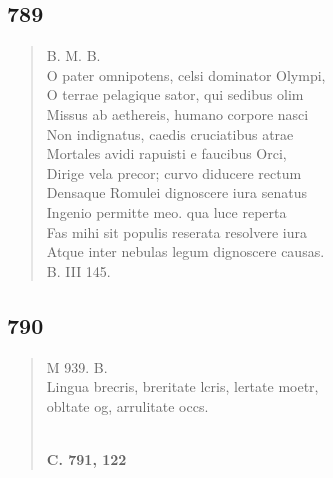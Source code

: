\documentclass[11pt, a4paper]{report}
\begin{document}
            \subsection*{789}
      \begin{verse}
      B. M. B. \\ O pater omnipotens, celsi dominator Olympi, \\ O terrae pelagique sator, qui sedibus olim \\ Missus ab aethereis, humano corpore nasci \\ Non indignatus, caedis cruciatibus atrae \\ Mortales avidi rapuisti e faucibus Orci, \\ Dirige vela precor; curvo diducere rectum \\ Densaque Romulei dignoscere iura senatus \\ Ingenio permitte meo. qua luce reperta \\ Fas mihi sit populis reserata resolvere iura \\ Atque inter nebulas legum dignoscere causas. \\ B. III 145. \\ 
      \end{verse}
  
            \subsection*{790}
      \begin{verse}
      M 939. B. \\ Lingua brecris, breritate lcris, lertate moetr, \\  \lbrack obltate og, arrulitate occs. \\ 
        ﻿\pagebreak 
    \begin{center} \textbf{C. 791, 122} \end{center} \marginpar{[269]} 
      \end{verse}
  
\end{document}
